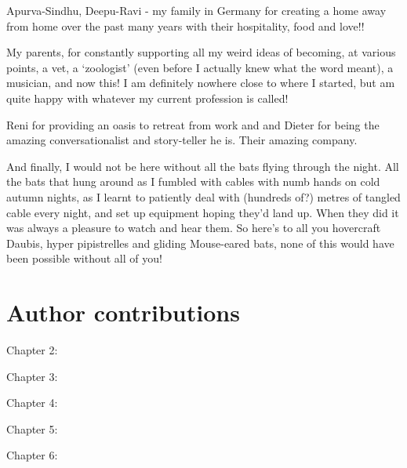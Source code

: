 \documentclass[
]{book}
\begin{document}
Apurva-Sindhu, Deepu-Ravi - my family in Germany for creating a home away from home over the past many years with their hospitality, food and love!!

My parents, for constantly supporting all my weird ideas of becoming, at various points, a vet, a `zoologist' (even before I actually knew what the word meant), a musician, and now this! I am definitely nowhere close to where I started, but am quite happy with whatever my current profession is called!

Reni for providing an oasis to retreat from work and and Dieter for being the amazing conversationalist and story-teller he is. Their amazing company.

And finally, I would not be here without all the bats flying through the night. All the bats that hung around as I fumbled with cables with numb hands on cold autumn nights, as I learnt to patiently deal with (hundreds of?) metres of tangled cable every night, and set up equipment hoping they'd land up. When they did it was always a pleasure to watch and hear them. So here's to all you hovercraft Daubis, hyper pipistrelles and gliding Mouse-eared bats, none of this would have been possible without all of you!

\hypertarget{author-contributions}{%
\chapter{Author contributions}\label{author-contributions}}

Chapter 2:

Chapter 3:

Chapter 4:

Chapter 5:

Chapter 6:

  
\end{document}
